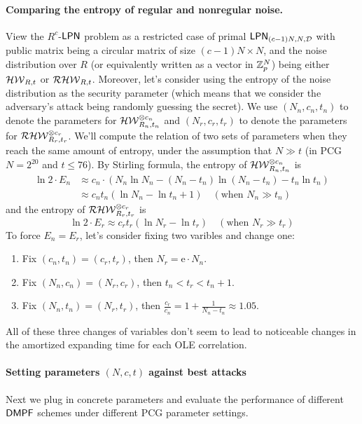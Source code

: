 \paragraph{Comparing the entropy of regular and nonregular noise.}View the $R^c$-${\sf LPN}$ problem as a restricted case of primal ${\sf LPN}_{(c-1)N, N,\mathcal{D}}$ with public matrix being a circular matrix of size $(c-1)N\times N$, and the noise distribution over $R$ (or equivalently written as a vector in $\mathbb{Z}_p^N$) being either $\mathcal{HW}_{R, t}$ or $\mathcal{RHW}_{R,t}$. Moreover, let's consider using the entropy of the noise distribution as the security parameter (which means that we consider the adversary's attack being randomly guessing the secret). We use $(N_n, c_n, t_n)$ to denote the parameters for $\mathcal{HW}^{\otimes c_n}_{R_n, t_n}$ and $(N_r, c_r, t_r)$ to denote the parameters for $\mathcal{RHW}^{\otimes c_r}_{R_r, t_r}$. We'll compute the relation of two sets of parameters when they reach the same amount of entropy, under the assumption that $N\gg t$ (in PCG $N = 2^{20}$ and $t\le 76$). By Stirling formula, the entropy of $\mathcal{HW}^{\otimes c_n}_{R_n, t_n}$ is 
\[
  \begin{split}
    \ln 2 \cdot E_n &\approx c_n\cdot \left(N_n\ln N_n - (N_n-t_n)\ln(N_n-t_n) - t_n\ln t_n\right) \\&\approx c_n t_n\left(\ln N_n - \ln t_n + 1\right) \quad(\text{when }N_n\gg t_n)
  \end{split}\]
and the entropy of $\mathcal{RHW}^{\otimes c_r}_{R_r, t_r}$ is 
\[
    \ln 2\cdot E_r \approx c_rt_r\left(\ln N_r - \ln t_r\right) \quad(\text{when }N_r\gg t_r)
\]
To force $E_n = E_r$, let's consider fixing two varibles and change one: 
\begin{enumerate}
  \item Fix $(c_n, t_n) = (c_r, t_r)$, then $N_r = \mathrm{e}\cdot N_n$. 
  \item Fix $(N_n, c_n) = (N_r, c_r)$, then $t_n<t_r<t_n+1$. 
  \item Fix $(N_n, t_n) = (N_r, t_r)$, then $\frac{c_r}{c_n} = 1 + \frac{1}{N_n - t_n}\approx 1.05$. 
\end{enumerate}
All of these three changes of variables don't seem to lead to noticeable changes in the amortized expanding time for each OLE correlation. 
\fi

\paragraph{Setting parameters $(N,c,t)$ against best attacks}Next we plug in concrete parameters and evaluate the performance of different ${\sf DMPF}$ schemes under different PCG parameter settings. 

